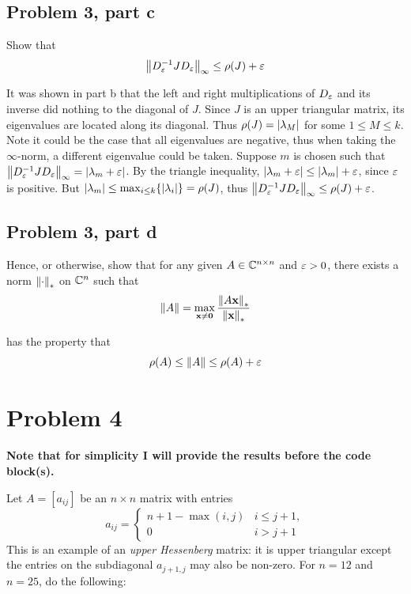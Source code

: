 \subsection{Problem 3, part c}
Show that 
\[ 
\norm{D_\varepsilon^{-1}JD_\varepsilon}_\infty \leq \rho(J) + \varepsilon
\]

\partbreak
\begin{solution}
    
It was shown in part b that the left and right multiplications of $D_\varepsilon$ and its inverse did nothing to the diagonal of $J$. Since $J$ is an upper triangular matrix, its eigenvalues are located along its diagonal. Thus $\rho(J) = |\lambda_M|$ for some $1 \leq M \leq k$. Note it could be the case that all eigenvalues are negative, thus when taking the $\infty$-norm, a different eigenvalue could be taken. Suppose $m$ is chosen such that $\norm{D_\varepsilon^{-1}JD_\varepsilon}_\infty = |\lambda_m + \varepsilon|$. By the triangle inequality, $|\lambda_m + \varepsilon| \leq |\lambda_m| + \varepsilon$, since $\varepsilon$ is positive. But $|\lambda_m| \leq \max_{i \leq k}\{|\lambda_i|\} = \rho(J)$, thus $\norm{D_\varepsilon^{-1}JD_\varepsilon}_\infty \leq \rho(J) + \varepsilon$. 
\end{solution}

\newpage
\subsection{Problem 3, part d}
Hence, or otherwise, show that for any given $A\in \mathbb{C}^{n\times n}$ and $\varepsilon > 0$, there exists a norm $\norm{\cdot}_*$ on $\mathbb{C}^n$ such that 
\[
\norm{A} = \max_{\textbf{x} \neq \textbf{0}} \frac{\norm{A\textbf{x}}_*}{\norm{\textbf{x}}_*}
\]

has the property that 
\[
\rho(A) \leq \norm{A} \leq \rho(A) + \varepsilon
\]
\partbreak

\begin{solution}
    
\end{solution}
\newpage
\section{Problem 4}
\textbf{Note that for simplicity I will provide the results before the code block(s).}

Let $A = [a_{ij}]$ be an $n \times n$ matrix with entries
\[
a_{ij} = 
\begin{cases}
    n + 1 - \max (i, j) &i \leq j + 1, \\
    0   & i > j + 1
\end{cases}
\]
This is an example of an \textit{upper Hessenberg} matrix: it is upper triangular except the entries on the subdiagonal $a_{j + 1, j}$ may also be non-zero. For $n = 12$ and $n = 25$, do the following:

